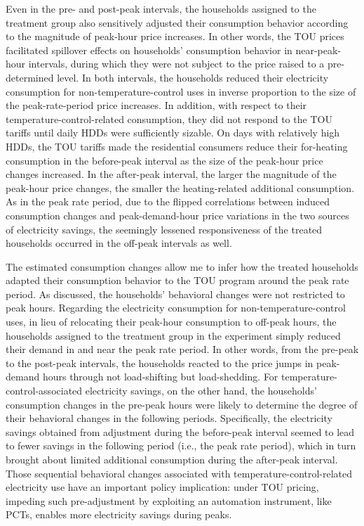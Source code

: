 Even in the pre- and post-peak intervals, the households assigned to the treatment group also sensitively adjusted their consumption behavior according to the magnitude of peak-hour price increases. In other words, the TOU prices facilitated spillover effects on households' consumption behavior in near-peak-hour intervals, during which they were not subject to the price raised to a pre-determined level. In both intervals, the households reduced their electricity consumption for non-temperature-control uses in inverse proportion to the size of the peak-rate-period price increases. In addition, with respect to their temperature-control-related consumption, they did not respond to the TOU tariffs until daily HDDs were sufficiently sizable. On days with relatively high HDDs, the TOU tariffs made the residential consumers reduce their for-heating consumption in the before-peak interval as the size of the peak-hour price changes increased. In the after-peak interval, the larger the magnitude of the peak-hour price changes, the smaller the heating-related additional consumption. As in the peak rate period, due to the flipped correlations between induced consumption changes and peak-demand-hour price variations in the two sources of electricity savings, the seemingly lessened responsiveness of the treated households occurred in the off-peak intervals as well. 

The estimated consumption changes allow me to infer how the treated households adapted their consumption behavior to the TOU program around the peak rate period. As discussed, the households' behavioral changes were not restricted to peak hours. Regarding the electricity consumption for non-temperature-control uses, in lieu of relocating their peak-hour consumption to off-peak hours, the households assigned to the treatment group in the experiment simply reduced their demand in and near the peak rate period. In other words, from the pre-peak to the post-peak intervals, the households reacted to the price jumps in peak-demand hours through not load-shifting but load-shedding. For temperature-control-associated electricity savings, on the other hand, the households' consumption changes in the pre-peak hours were likely to determine the degree of their behavioral changes in the following periods. Specifically, the electricity savings obtained from adjustment during the before-peak interval seemed to lead to fewer savings in the following period (i.e., the peak rate period), which in turn brought about limited additional consumption during the after-peak interval. Those sequential behavioral changes associated with temperature-control-related electricity use have an important policy implication: under TOU pricing, impeding such pre-adjustment by exploiting an automation instrument, like PCTs, enables more electricity savings during peaks.

